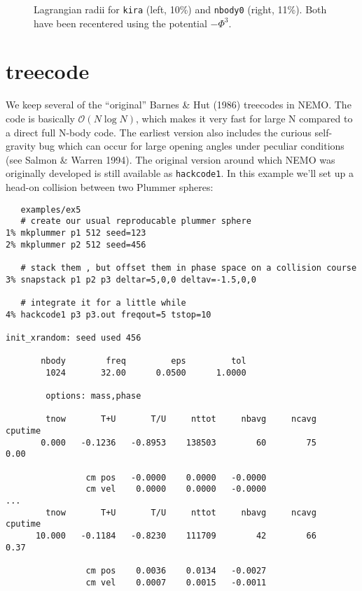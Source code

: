 {\begin{verbatim}
\end{verbatim}\normalsize


\begin{figure}[htb]
\caption[Lagrangian radii for kira and nbody0]
{Lagrangian radii for {\tt kira} (left, 10\%) and {\tt nbody0} (right, 11\%).
Both have been recentered using the potential $-\Phi^3$.
}
\label{f:kira}
\end{figure}


\section{treecode}

We keep several of the ``original'' 
Barnes \& Hut (1986) treecodes in NEMO. 
The code is basically $\mathcal{O}(N \log{N})$, which makes it very fast 
for large N compared to a direct full N-body code.
The earliest version also
includes the curious self-gravity bug which can occur for large opening angles
under peculiar conditions (see Salmon \& Warren 1994).
The original version around which NEMO was originally
developed is still available as
{\tt hackcode1}. In this example we'll set up a head-on collision between
two Plummer spheres:

\footnotesize\begin{verbatim}
   examples/ex5
   # create our usual reproducable plummer sphere
1% mkplummer p1 512 seed=123
2% mkplummer p2 512 seed=456

   # stack them , but offset them in phase space on a collision course
3% snapstack p1 p2 p3 deltar=5,0,0 deltav=-1.5,0,0 

   # integrate it for a little while
4% hackcode1 p3 p3.out freqout=5 tstop=10
 
init_xrandom: seed used 456
 
       nbody        freq         eps         tol
        1024       32.00      0.0500      1.0000
 
        options: mass,phase
 
        tnow       T+U       T/U     nttot     nbavg     ncavg   cputime
       0.000   -0.1236   -0.8953    138503        60        75      0.00
 
                cm pos   -0.0000    0.0000   -0.0000
                cm vel    0.0000    0.0000   -0.0000
...
        tnow       T+U       T/U     nttot     nbavg     ncavg   cputime
      10.000   -0.1184   -0.8230    111709        42        66      0.37
 
                cm pos    0.0036    0.0134   -0.0027
                cm vel    0.0007    0.0015   -0.0011
 

\end{verbatim}}
